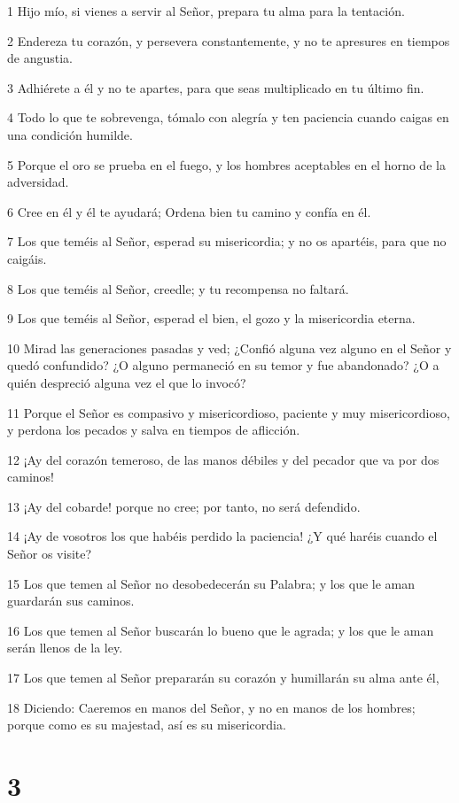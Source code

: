 \par 1 Hijo mío, si vienes a servir al Señor, prepara tu alma para la tentación.
\par 2 Endereza tu corazón, y persevera constantemente, y no te apresures en tiempos de angustia.
\par 3 Adhiérete a él y no te apartes, para que seas multiplicado en tu último fin.
\par 4 Todo lo que te sobrevenga, tómalo con alegría y ten paciencia cuando caigas en una condición humilde.
\par 5 Porque el oro se prueba en el fuego, y los hombres aceptables en el horno de la adversidad.
\par 6 Cree en él y él te ayudará; Ordena bien tu camino y confía en él.
\par 7 Los que teméis al Señor, esperad su misericordia; y no os apartéis, para que no caigáis.
\par 8 Los que teméis al Señor, creedle; y tu recompensa no faltará.
\par 9 Los que teméis al Señor, esperad el bien, el gozo y la misericordia eterna.
\par 10 Mirad las generaciones pasadas y ved; ¿Confió alguna vez alguno en el Señor y quedó confundido? ¿O alguno permaneció en su temor y fue abandonado? ¿O a quién despreció alguna vez el que lo invocó?
\par 11 Porque el Señor es compasivo y misericordioso, paciente y muy misericordioso, y perdona los pecados y salva en tiempos de aflicción.
\par 12 ¡Ay del corazón temeroso, de las manos débiles y del pecador que va por dos caminos!
\par 13 ¡Ay del cobarde! porque no cree; por tanto, no será defendido.
\par 14 ¡Ay de vosotros los que habéis perdido la paciencia! ¿Y qué haréis cuando el Señor os visite?
\par 15 Los que temen al Señor no desobedecerán su Palabra; y los que le aman guardarán sus caminos.
\par 16 Los que temen al Señor buscarán lo bueno que le agrada; y los que le aman serán llenos de la ley.
\par 17 Los que temen al Señor prepararán su corazón y humillarán su alma ante él,
\par 18 Diciendo: Caeremos en manos del Señor, y no en manos de los hombres; porque como es su majestad, así es su misericordia.

\chapter{3}

